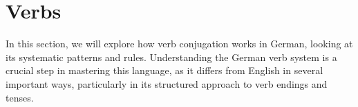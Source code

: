 \section{Verbs}\label{sec:verbs}

In this section, we will explore how verb conjugation works in German, looking at its systematic patterns and rules. Understanding the German verb system is a crucial step in mastering this language, as it differs from English in several important ways, particularly in its structured approach to verb endings and tenses.